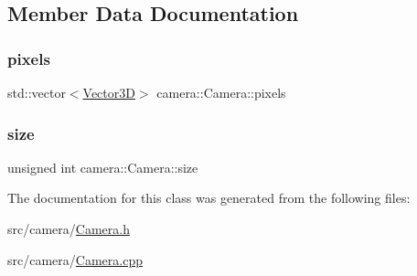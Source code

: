 \subsection{Member Data Documentation}
\mbox{\label{classcamera_1_1Camera_a53f3fe9b838bc48e9ec21973dc8b516c}} 
\subsubsection{\texorpdfstring{pixels}{pixels}}
{\footnotesize\ttfamily std\+::vector$<$\mbox{\hyperlink{classVector3D}{Vector3D}}$>$ camera\+::\+Camera\+::pixels\hspace{0.3cm}{\ttfamily [protected]}}

\mbox{\label{classcamera_1_1Camera_ac05b929c8b4f40d74ee682c4aad4c53d}} 
\subsubsection{\texorpdfstring{size}{size}}
{\footnotesize\ttfamily unsigned int camera\+::\+Camera\+::size\hspace{0.3cm}{\ttfamily [protected]}}



The documentation for this class was generated from the following files\+:\begin{DoxyCompactItemize}
\item 
src/camera/\mbox{\hyperlink{Camera_8h}{Camera.\+h}}\item 
src/camera/\mbox{\hyperlink{Camera_8cpp}{Camera.\+cpp}}\end{DoxyCompactItemize}
